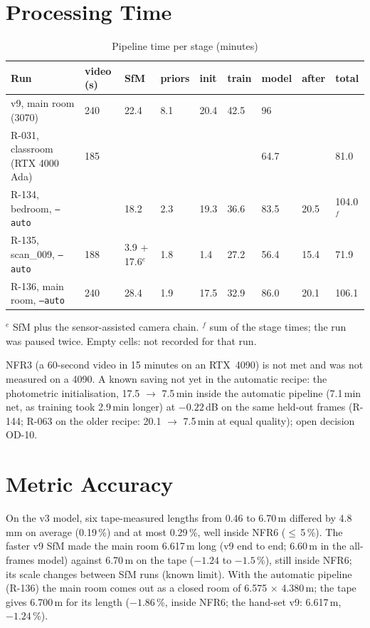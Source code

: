 \section{Processing Time}
\begin{table}[htbp]
\centering\small
\caption{Pipeline time per stage (minutes)}
\label{tab:eval-time}
\begin{tabular}{p{3.0cm}p{1.2cm}p{1.0cm}p{1.0cm}p{1.0cm}p{1.0cm}p{1.2cm}p{1.2cm}p{1.2cm}}
\toprule
\textbf{Run} & \textbf{video (s)} & \textbf{SfM} & \textbf{priors} & \textbf{init} & \textbf{train} & \textbf{model} & \textbf{after} & \textbf{total} \\
\midrule
v9, main room (3070) & 240 & 22.4 & 8.1 & 20.4 & 42.5 & 96 & & \\
R-031, classroom (RTX 4000 Ada) & 185 & & & & & 64.7 & & 81.0 \\
R-134, bedroom, \texttt{--auto} & & 18.2 & 2.3 & 19.3 & 36.6 & 83.5 & 20.5 & 104.0$^f$ \\
R-135, scan\_009, \texttt{--auto} & 188 & 3.9 + 17.6$^e$ & 1.8 & 1.4 & 27.2 & 56.4 & 15.4 & 71.9 \\
R-136, main room, \texttt{--auto} & 240 & 28.4 & 1.9 & 17.5 & 32.9 & 86.0 & 20.1 & 106.1 \\
\bottomrule
\end{tabular}

\smallskip
\footnotesize $^e$ SfM plus the sensor-assisted camera chain. $^f$ sum of the stage times; the run was paused
twice. Empty cells: not recorded for that run.
\end{table}
NFR3 (a 60-second video in 15 minutes on an RTX~4090) is not met and was not measured on a 4090. A known saving not yet
in the automatic recipe: the photometric initialisation, 17.5 $\rightarrow$ 7.5\,min inside the automatic pipeline
(7.1\,min net, as training took 2.9\,min longer) at $-0.22$\,dB on the same held-out frames (R-144; R-063 on the older
recipe: 20.1 $\rightarrow$ 7.5\,min at equal quality); open decision OD-10.

\section{Metric Accuracy}
\label{sec:eval-accuracy}
On the v3 model, six tape-measured lengths from 0.46 to 6.70\,m differed by 4.8\,mm on average (0.19\,\%) and at most
0.29\,\%, well inside NFR6 ($\leq$\,5\,\%). The faster v9 SfM made the main room 6.617\,m long (v9 end to end; 6.60\,m in the all-frames model) against
6.70\,m on the tape ($-1.24$ to $-1.5$\,\%), still inside NFR6; its scale changes between SfM runs (known limit).
With the automatic pipeline (R-136) the main room comes out as a closed room of 6.575 $\times$ 4.380\,m; the tape
gives 6.700\,m for its length ($-1.86$\,\%, inside NFR6; the hand-set v9: 6.617\,m, $-1.24$\,\%).

